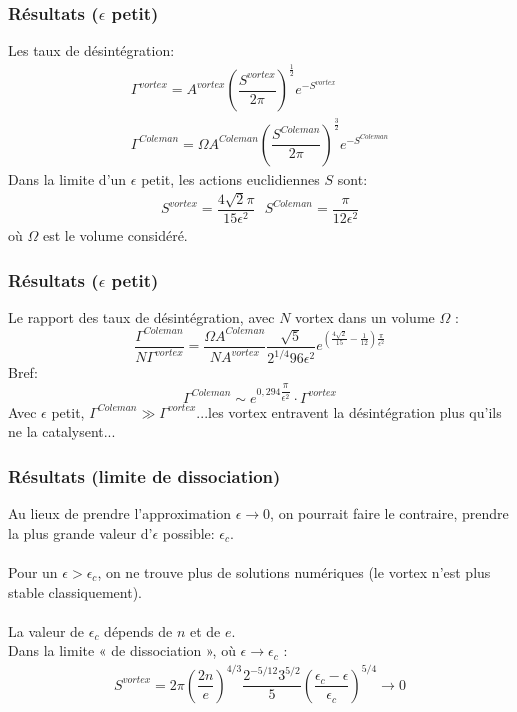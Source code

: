 \documentclass{beamer}
\begin{document}
\begin{frame}
\frametitle{Résultats ($\epsilon$ petit)}
Les taux de désintégration: 
\begin{equation*}
\begin{array}{l}
\Gamma^{vortex} =        A^{vortex} \left( \dfrac{ S^{vortex}}{2 \pi} \right)  ^{\frac{1}{2}} e^{-S^{vortex}} \\
\Gamma^{Coleman}= \Omega A^{Coleman}\left( \dfrac{ S^{Coleman}}{2 \pi} \right) ^{\frac{3}{2}} e^{-S^{Coleman}}
\end{array}
\end{equation*}
Dans la limite d'un $\epsilon$ petit, les actions euclidiennes $S$ sont:
\begin{equation*}
\begin{array}{l}
S^{vortex} =\dfrac{4 \sqrt{2} \pi}{15 \epsilon^2} \: \: \:
S^{Coleman}   =\dfrac{\pi}{12 \epsilon^2}
\end{array}
\end{equation*}
où $\Omega$ est le volume considéré.
\end{frame}



\begin{frame}
\frametitle{Résultats ($\epsilon$ petit)}
Le rapport des taux de désintégration, avec $N$ vortex dans un volume $\Omega$ :
\begin{equation*}
\dfrac{\Gamma^{Coleman}}{N \Gamma^{vortex}} =
\dfrac{\Omega A^{Coleman}}{N A^{vortex}} \dfrac{\sqrt{5}}{2^{1/4} 96 \epsilon^{2}}
e^{ \left( \frac{4 \sqrt{2}}{15} - \frac{1}{12} \right)  \frac{\pi}{\epsilon^{2}}  }
\end{equation*}
Bref:
\begin{equation*}
\Gamma^{Coleman} \sim e^{  0,294   \dfrac{\pi}{\epsilon^{2}}  } \cdot \Gamma^{vortex}
\end{equation*}
Avec $\epsilon$ petit, $\Gamma^{Coleman} \gg  \Gamma^{vortex}$...les vortex entravent la désintégration plus qu'ils ne la catalysent...
\end{frame}

\begin{frame}
\frametitle{Résultats (limite de dissociation)}
Au lieux de prendre l'approximation $\epsilon \rightarrow 0$, on pourrait faire le contraire, prendre la plus grande valeur d'$\epsilon$ possible: $\epsilon_{c}$.\\
~~\\
Pour un $\epsilon > \epsilon_{c}$, on ne trouve plus de solutions numériques (le vortex n'est plus stable classiquement).\\
~~\\
La valeur de $\epsilon_{c}$ dépends de $n$ et de $e$.\\
Dans la limite « de dissociation », où $\epsilon \rightarrow \epsilon_{c}$ :
\begin{equation*}
\begin{array}{l}
S^{vortex} = 2\pi \left(  \dfrac{2 n}{e}  \right)^{4/3}   \dfrac{2^{-5/12} 3^{5/2}}{5} 
\left(  \dfrac{\epsilon_{c}- \epsilon}{\epsilon_{c}} \right)  ^{5/4} \rightarrow 0
\end{array}
\end{equation*}
\end{frame}
\end{document}
